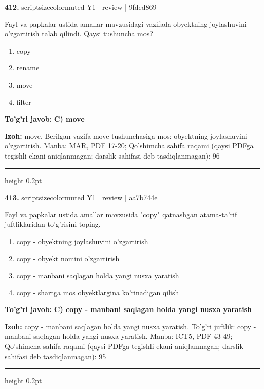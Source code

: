 \documentclass[10pt,a4paper]{article}
\begin{document}
{\bfseries\sffamily\color{ink} 412.} {scriptsizecolor{muted} Y1 | review | 9fded869}
\par
Fayl va papkalar ustida amallar mavzusidagi vazifada obyektning joylashuvini o'zgartirish talab qilindi. Qaysi tushuncha mos?
\begin{enumerate}[label=\Alph*),leftmargin=9mm]
\item copy
\item rename
\item move
\item filter
\end{enumerate}
\begin{tcolorbox}[enhanced,breakable,colback=teal!4,colframe=teal!60!black,boxrule=0.45pt,arc=1.2mm,left=2.7mm,right=2.7mm,top=1.8mm,bottom=1.8mm,before skip=2mm,after skip=2mm]
{\bfseries\sffamily\color{teal}To'g'ri javob:} \textbf{C) move}
\par\smallskip
{\bfseries Izoh:} move. Berilgan vazifa move tushunchasiga mos: obyektning joylashuvini o'zgartirish. Manba: MAR, PDF 17-20; Qo'shimcha sahifa raqami (qaysi PDFga tegishli ekani aniqlanmagan; darslik sahifasi deb tasdiqlanmagan): 96
\end{tcolorbox}
\vspace{2mm}\hrule height 0.2pt\vspace{3mm}

{\bfseries\sffamily\color{ink} 413.} {scriptsizecolor{muted} Y1 | review | aa7b744e}
\par
Fayl va papkalar ustida amallar mavzusida "copy" qatnashgan atama-ta'rif juftliklaridan to'g'risini toping.
\begin{enumerate}[label=\Alph*),leftmargin=9mm]
\item copy - obyektning joylashuvini o'zgartirish
\item copy - obyekt nomini o'zgartirish
\item copy - manbani saqlagan holda yangi nusxa yaratish
\item copy - shartga mos obyektlargina ko'rinadigan qilish
\end{enumerate}
\begin{tcolorbox}[enhanced,breakable,colback=teal!4,colframe=teal!60!black,boxrule=0.45pt,arc=1.2mm,left=2.7mm,right=2.7mm,top=1.8mm,bottom=1.8mm,before skip=2mm,after skip=2mm]
{\bfseries\sffamily\color{teal}To'g'ri javob:} \textbf{C) copy - manbani saqlagan holda yangi nusxa yaratish}
\par\smallskip
{\bfseries Izoh:} copy - manbani saqlagan holda yangi nusxa yaratish. To'g'ri juftlik: copy - manbani saqlagan holda yangi nusxa yaratish. Manba: ICT5, PDF 43-49; Qo'shimcha sahifa raqami (qaysi PDFga tegishli ekani aniqlanmagan; darslik sahifasi deb tasdiqlanmagan): 95
\end{tcolorbox}
\vspace{2mm}\hrule height 0.2pt\vspace{3mm}
\end{document}
